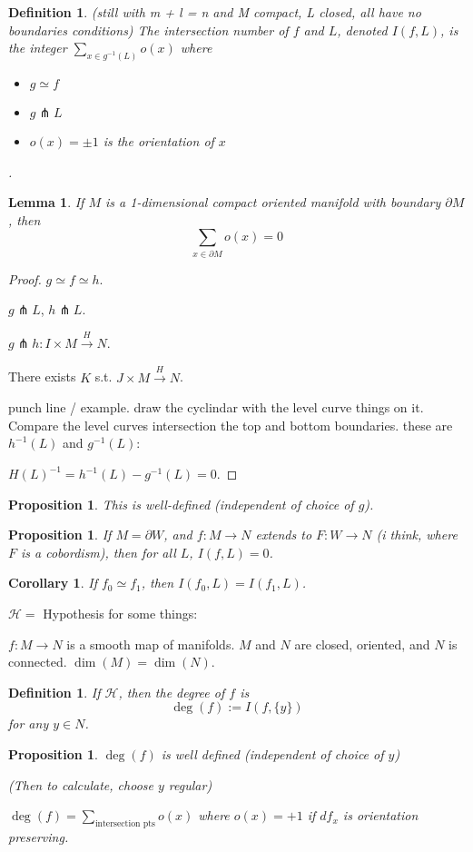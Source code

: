 \documentclass[11pt]{amsbook}
\newenvironment{dateenv}{
	\vspace{1em}
}{
	\vspace{1em}
}
\newcommand{\mydate}[4]{
	\newdate{#1}{#2}{#3}{#4}
	\begin{dateenv}
		\hfill\displaydate{#1}
	\end{dateenv}
}
\theoremstyle{mystyle} \newtheorem{thrm}[thm]{Theorem}
\theoremstyle{mystyle} \newtheorem{defi}[thm]{Definition}
\theoremstyle{mystyle} \newtheorem{coro}[thm]{Corollary}
\theoremstyle{mystyle} \newtheorem{propo}[thm]{Proposition}
\theoremstyle{mystyle} \newtheorem{lemm}[thm]{Lemma}
\numberwithin{thm}{section}
\newcommand{\homotopic}{\simeq}
\renewcommand{\d}{\partial}
\newcommand{\transverse}{\pitchfork}
\newcommand{\x}{\times}
\newcommand{\de}{\emph}
\begin{document}
\begin{defi}
	(still with m + l = n and M compact, L closed, all have no boundaries conditions)
	The \emph{intersection number} of $f$ and $L$, denoted $I(f, L)$, is the integer $\sum_{x \in g^{-1}(L)} o(x)$ where
	\begin{itemize}
		\item $g \homotopic f$
		\item $g \transverse L$
		\item $o(x) = \pm 1$ is the orientation of $x$
	\end{itemize}.
\end{defi}
\begin{lemm}
	If $M$ is a 1-dimensional compact oriented manifold with boundary $\d M$, then $$\sum_{x \in \d M} o(x) = 0$$
\end{lemm}
\begin{proof}
	$g \homotopic f \homotopic h$.

	$g \transverse L$, $h \transverse L$.

	$g \transverse h : I \x M \overset{H}{\to} N$.

	There exists $K$ s.t. $J \x M \overset{\overset{~}{H}}{\to} N$.

	punch line / example.  draw the cyclindar with the level curve things on it.  Compare the level curves intersection the top and bottom boundaries.  these are $h^{-1}(L)$ and $g^{-1}(L)$:

	$\overset{~}{H}(L)^{-1} = h^{-1}(L) - g^{-1}(L) = 0$.
\end{proof}

\mydate{d17}{21}{11}{2016}

\begin{propo}
	This is well-defined (independent of choice of $g$).
\end{propo}
\begin{propo}
	If $M = \d W$, and $f: M \to N$ extends to $F: W \to N$ (i think, where $F$ is a cobordism), then for all $L$, $I(f,L) = 0$.
\end{propo}
\begin{coro}
	If $f_0 \homotopic f_1$, then $I(f_0, L) = I(f_1, L)$.
\end{coro}

$\mathcal{H} = $ Hypothesis for some things:

$f: M \to N$ is a smooth map of manifolds.  $M$ and $N$ are closed, oriented, and $N$  is connected.  $\dim(M) = \dim(N)$.

\begin{defi}
	If $\mathcal{H}$, then the \de{degree} of $f$ is $$\deg(f) := I(f, \{y\})$$ for any $y \in N$.
\end{defi}
\begin{propo}
	$\deg(f)$ is well defined (independent of choice of $y$)

	(Then to calculate, choose $y$ regular)

	$\deg(f) = \sum_{\text{intersection pts}} o(x)$ where $o(x) = +1$ if $df_x$ is orientation preserving.
\end{propo}
\end{document}
